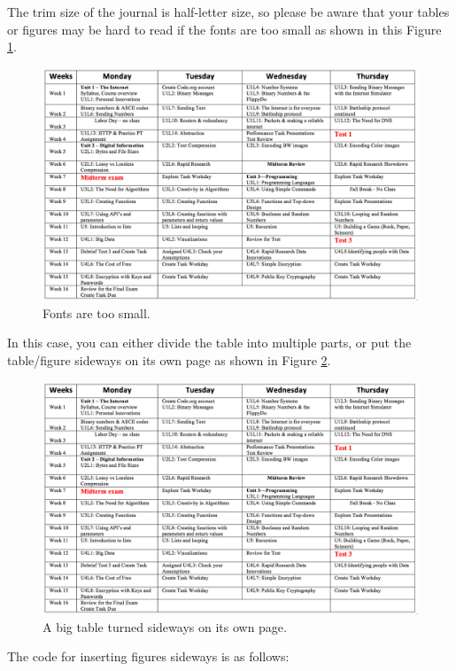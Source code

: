 \documentclass{article}
\begin{document}
The trim size of the journal is half-letter size, so please be aware that your
tables or figures may be hard to read if the fonts are too small as shown in
this Figure \ref{figure:big_table}.
\begin{figure}[htbp]
\centering
\includegraphics[width=\textwidth]{big_table.png}
\caption{Fonts are too small.}
\label{figure:big_table}
\end{figure}

In this case, you can either divide the table into multiple parts, or put the
table/figure sideways on its own page as shown in Figure \ref{figure:big_table1}.
\begin{figure}
  \includegraphics[width=\textwidth]{big_table.png}
  \caption{A big table turned sideways on its own page.}
  \label{figure:big_table1}
\end{figure}

The code for inserting figures sideways is as follows:
\end{document}
